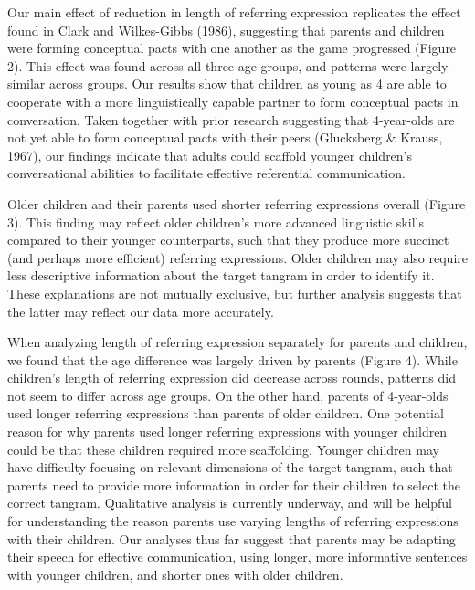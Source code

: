 \documentclass[10pt, letterpaper]{article}
\begin{document}
Our main effect of reduction in length of referring expression
replicates the effect found in Clark and Wilkes-Gibbs (1986), suggesting
that parents and children were forming conceptual pacts with one another
as the game progressed (Figure 2). This effect was found across all
three age groups, and patterns were largely similar across groups. Our
results show that children as young as 4 are able to cooperate with a
more linguistically capable partner to form conceptual pacts in
conversation. Taken together with prior research suggesting that
4-year-olds are not yet able to form conceptual pacts with their peers
(Glucksberg \& Krauss, 1967), our findings indicate that adults could
scaffold younger children's conversational abilities to facilitate
effective referential communication.

Older children and their parents used shorter referring expressions
overall (Figure 3). This finding may reflect older children's more
advanced linguistic skills compared to their younger counterparts, such
that they produce more succinct (and perhaps more efficient) referring
expressions. Older children may also require less descriptive
information about the target tangram in order to identify it. These
explanations are not mutually exclusive, but further analysis suggests
that the latter may reflect our data more accurately.

When analyzing length of referring expression separately for parents and
children, we found that the age difference was largely driven by parents
(Figure 4). While children's length of referring expression did decrease
across rounds, patterns did not seem to differ across age groups. On the
other hand, parents of 4-year-olds used longer referring expressions
than parents of older children. One potential reason for why parents
used longer referring expressions with younger children could be that
these children required more scaffolding. Younger children may have
difficulty focusing on relevant dimensions of the target tangram, such
that parents need to provide more information in order for their
children to select the correct tangram. Qualitative analysis is
currently underway, and will be helpful for understanding the reason
parents use varying lengths of referring expressions with their
children. Our analyses thus far suggest that parents may be adapting
their speech for effective communication, using longer, more informative
sentences with younger children, and shorter ones with older children.
\end{document}
